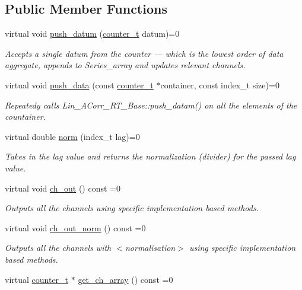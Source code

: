 \subsection*{Public Member Functions}
\begin{DoxyCompactItemize}
\item 
virtual void \hyperlink{classLin__ACorr__RT__Base_a398167525faf2a65f29722e943a0c57e}{push\+\_\+datum} (\hyperlink{types_8hpp_a22f279793847eba127de149437848c48}{counter\+\_\+t} datum)=0
\begin{DoxyCompactList}\small\item\em Accepts a single {\ttfamily datum} from the counter — which is the lowest order of data aggregate, appends to Series\+\_\+array and updates relevant channels. \end{DoxyCompactList}\item 
virtual void \hyperlink{classLin__ACorr__RT__Base_a91c95a49619995f40aeae80916afed3e}{push\+\_\+data} (const \hyperlink{types_8hpp_a22f279793847eba127de149437848c48}{counter\+\_\+t} $\ast$container, const index\+\_\+t size)=0
\begin{DoxyCompactList}\small\item\em Repeatedy calls {\ttfamily Lin\+\_\+\+A\+Corr\+\_\+\+R\+T\+\_\+\+Base\+::push\+\_\+datam()} on all the elements of the countainer. \end{DoxyCompactList}\item 
virtual double \hyperlink{classLin__ACorr__RT__Base_a06c0bbe593f87a9034aa34e95d9d46db}{norm} (index\+\_\+t lag)=0
\begin{DoxyCompactList}\small\item\em Takes in the lag value and returns the normalization (divider) for the passed lag value. \end{DoxyCompactList}\item 
virtual void \hyperlink{group__Lin__ACorr__Base__Out_ga4fe3bd7a6a98388d46827d22dc4596c9}{ch\+\_\+out} () const =0
\begin{DoxyCompactList}\small\item\em Outputs all the channels using specific implementation based methods. \end{DoxyCompactList}\item 
virtual void \hyperlink{group__Lin__ACorr__Base__Out_ga3e58cb03c3a93107758d506c53cf2461}{ch\+\_\+out\+\_\+norm} () const =0
\begin{DoxyCompactList}\small\item\em Outputs all the channels with {\bfseries } $<$normalisation$>$ using specific implementation based methods. \end{DoxyCompactList}\item 
virtual \hyperlink{types_8hpp_a22f279793847eba127de149437848c48}{counter\+\_\+t} $\ast$ \hyperlink{group__Lin__ACorr__Base__Out_gafb6585805776a54d5e4f120cfd1fea9e}{get\+\_\+ch\+\_\+array} () const =0
\end{DoxyCompactItemize}


